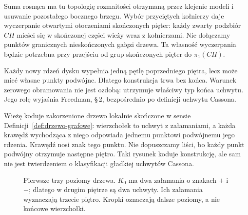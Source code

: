 Suma rosnąca ma tu topologię rozmaitości otrzymaną
przez klejenie modeli i usuwanie pozostałego bocznego brzegu.
Wybór przyciętych kołnierzy daje wyczerpanie otwartymi
otoczeniami skończonych pięter: każdy zwarty podzbiór $CH$
mieści się w skończonej części wieży wraz z kołnierzami.
Nie dołączamy punktów granicznych nieskończonych gałęzi
drzewa. Ta własność wyczerpania będzie potrzebna przy
przejściu od grup skończonych pięter do $\pi_1(CH)$.

Każdy nowy rdzeń dysku wypełnia jedną pętlę
poprzedniego piętra, lecz może mieć własne punkty
podwójne. Dlatego konstrukcja trwa bez końca.
Warunek zerowego obramowania nie jest ozdobą:
utrzymuje właściwy typ końca uchwytu. Jego rolę
wyjaśnia Freedman, \S\,2, bezpośrednio po definicji
uchwytu Cassona.

Wieżę koduje zakorzenione drzewo lokalnie skończone
w sensie Definicji~\ref{def:drzewo-grafowe}:
wierzchołek to uchwyt z załamaniami, a każda krawędź
wychodząca z niego odpowiada jednemu punktowi
podwójnemu jego rdzenia. Krawędź nosi znak tego
punktu. Nie dopuszczamy liści, bo każdy punkt
podwójny otrzymuje następne piętro. Taki rysunek
koduje konstrukcję, ale sam nie jest twierdzeniem
o klasyfikacji gładkiej uchwytów Cassona.

\begin{figure}[htbp]
\centering
{}
\caption{Pierwsze trzy poziomy drzewa. $K_0$ ma
dwa załamania o znakach $+$ i $-$; dlatego w drugim
piętrze są dwa uchwyty. Ich załamania wyznaczają
trzecie piętro. Kropki oznaczają dalsze poziomy,
a nie końcowe wierzchołki.}
\label{fig:casson-signed-tree}
\end{figure}


